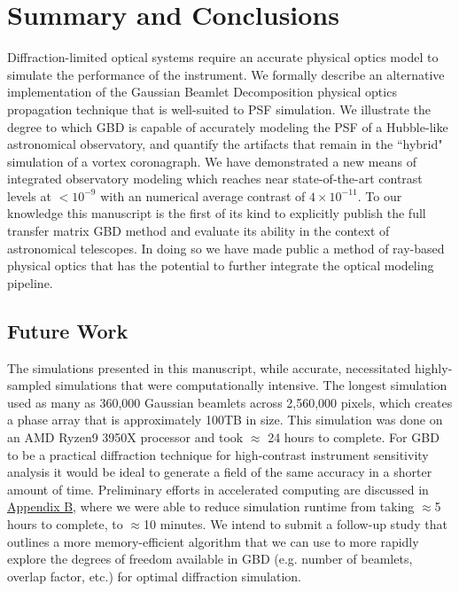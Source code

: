 \section{Summary and Conclusions}
\label{sec:conclusion}  %

Diffraction-limited optical systems require an accurate physical optics model to simulate the performance of the instrument. We formally describe an alternative implementation of the Gaussian Beamlet Decomposition physical optics propagation technique that is well-suited to PSF simulation. We illustrate the degree to which GBD is capable of accurately modeling the PSF of a Hubble-like astronomical observatory, and quantify the artifacts that remain in the ``hybrid" simulation of a vortex coronagraph. We have demonstrated a new means of integrated observatory modeling which reaches near state-of-the-art contrast levels at $< 10^{-9}$ with an numerical average contrast of $4\times10^{-11}$.
To our knowledge this manuscript is the first of its kind to explicitly publish the full transfer matrix GBD method and evaluate its ability in the context of astronomical telescopes. In doing so we have made public a method of ray-based physical optics that has the potential to further integrate the optical modeling pipeline.

\subsection{Future Work}
The simulations presented in this manuscript, while accurate, necessitated highly-sampled simulations that were computationally intensive. The longest simulation used as many as 360,000 Gaussian beamlets across 2,560,000 pixels, which creates a phase array that is approximately 100TB in size. This simulation was done on an AMD Ryzen9 3950X processor and took $\approx$ 24 hours to complete. 
For GBD to be a practical diffraction technique for high-contrast instrument sensitivity analysis it would be ideal to generate a field of the same accuracy in a shorter amount of time. Preliminary efforts in accelerated computing are discussed in \hyperref[sec:appendixB]{Appendix B}, where we were able to reduce simulation runtime from taking $\approx$5 hours to complete, to $\approx$10 minutes. We intend to submit a follow-up study that outlines a more memory-efficient algorithm that we can use to more rapidly explore the degrees of freedom available in GBD (e.g. number of beamlets, overlap factor, etc.) for optimal diffraction simulation.

